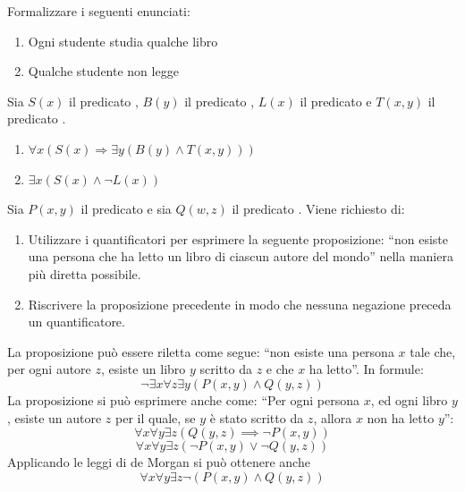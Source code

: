 
\begin{esercizio}    
Formalizzare i seguenti enunciati: 	
\begin{enumerate}
    \item Ogni studente studia qualche libro
    \item Qualche studente non legge 
\end{enumerate}
\end{esercizio}

\begin{soluzione}	
Sia $S(x)$ il predicato , $B(y)$ il predicato , $L(x)$ il predicato  e  $T(x,y)$ il predicato . 

\begin{enumerate}
    \item $\forall x (S(x) \Rightarrow \exists y (B(y) \wedge T(x,y)))$
    \item $\exists x (S(x) \wedge \neg L(x))$
\end{enumerate}
\end{soluzione}


\begin{esercizio}
Sia $P(x, y)$ il predicato  e sia $Q(w, z)$ il predicato .
Viene richiesto di:
\begin{enumerate}
    \item Utilizzare i quantificatori per esprimere la seguente proposizione: ``non esiste una persona che ha letto un libro di ciascun autore del mondo'' nella maniera più diretta possibile.
    \item Riscrivere la proposizione precedente in modo che nessuna negazione preceda un quantificatore.
\end{enumerate}
\end{esercizio}

\begin{soluzione}
La proposizione può essere riletta come segue: ``non esiste una persona $x$ tale che, per ogni autore $z$, esiste un libro $y$ scritto da $z$ e che $x$ ha letto''.
In formule:
$$\neg\exists x \forall z \exists y (P(x, y)\land Q(y, z))$$
La proposizione si può esprimere anche come:
``Per ogni persona $x$, ed ogni libro $y$, esiste un autore $z$ per il quale, se $y$ è stato scritto da $z$, allora $x$ non ha letto $y$'':
$$\forall x\forall y \exists z (Q(y,z)\implies \neg P(x, y))$$
$$\forall x\forall y \exists z (\neg P(x,y) \lor \neg Q(y,z))$$
Applicando le leggi di de Morgan si può ottenere anche
$$\forall x\forall y \exists z \neg(P(x,y) \land Q(y,z))$$

\end{soluzione}

